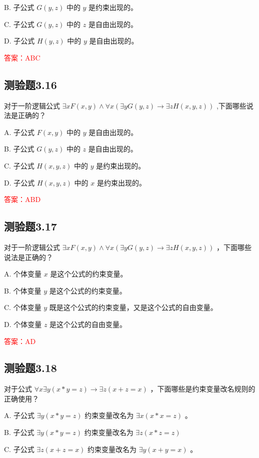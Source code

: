 \documentclass[UTF8, heading=true]{ctexart}
\begin{document}
B. 子公式 $G(y, z)$ 中的 $y$ 是约束出现的。

C. 子公式 $G(y, z)$ 中的 $z$ 是自由出现的。

D. 子公式 $H(y, z)$ 中的 $y$ 是自由出现的。

\textcolor{red}{答案：ABC}

\subsection{测验题3.16}

对于一阶逻辑公式 $\exists x F(x, y) \wedge \forall x(\exists y G(y, z) \rightarrow \exists z H(x, y, z))$ ,下面哪些说法是正确的？

A. 
子公式 $F(x, y)$ 中的 $y$ 是自由出现的。

B. 
子公式 $G(y, z)$ 中的 $z$ 是自由出现的。

C. 
子公式 $H(x, y, z)$ 中的 $y$ 是约束出现的。

D. 
子公式 $H(x, y, z)$ 中的 $x$ 是约束出现的。

\textcolor{red}{答案：ABD}

\subsection{测验题3.17}

对于一阶逻辑公式 $\exists x F(x, y) \wedge \forall x(\exists y G(y, z) \rightarrow \exists z H(x, y, z))$ ，下面哪些说法是正确的？

A. 个体变量 $x$ 是这个公式的约束变量。

B. 个体变量 $y$ 是这个公式的约束变量。

C. 个体变量 $y$ 既是这个公式的约束变量，又是这个公式的自由变量。

D. 个体变量 $z$ 是这个公式的自由变量。

\textcolor{red}{答案：AD}

\subsection{测验题3.18}

对于公式 $\forall x \exists y(x * y=z) \rightarrow \exists z(x+z=x)$ ，下面哪些是约束变量改名规则的正确使用？

A. 
子公式 $\exists y(x * y=z)$ 约束变量改名为 $\exists x(x * x=z)$ 。

B. 
子公式 $\exists y(x * y=z)$ 约束变量改名为 $\exists z(x * z=z)$

C. 
子公式 $\exists z(x+z=x)$ 约束变量改名为 $\exists y(x+y=x)$ 。
\end{document}
